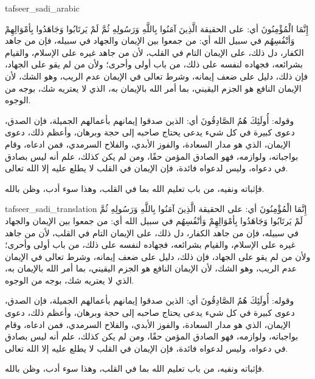 \begin{taggedblock}{tafseer_sadi_arabic}
\begin{Arabic}
{ إِنَّمَا الْمُؤْمِنُونَ }
أي: على الحقيقة
{ الَّذِينَ آمَنُوا بِاللَّهِ وَرَسُولِهِ ثُمَّ لَمْ يَرتَابُوا وَجَاهَدُوا بِأمْوَالِهِمْ وَأنْفُسِهُم في سبيل الله }
أي: من جمعوا بين الإيمان والجهاد في سبيله، فإن من جاهد الكفار، دل ذلك، على الإيمان التام في القلب، لأن من جاهد غيره على الإسلام، والقيام بشرائعه، فجهاده لنفسه على ذلك، من باب أولى وأحرى؛ ولأن من لم يقو على الجهاد، فإن ذلك، دليل على ضعف إيمانه، وشرط تعالى في الإيمان عدم الريب، وهو الشك، لأن الإيمان النافع هو الجزم اليقيني، بما أمر الله بالإيمان به، الذي لا يعتريه شك، بوجه من الوجوه.

وقوله:
{ أُولَئِكَ هُمُ الصَّادِقُونَ }
أي: الذين صدقوا إيمانهم بأعمالهم الجميلة، فإن الصدق، دعوى كبيرة في كل شيء يدعى يحتاج صاحبه إلى حجة وبرهان، وأعظم ذلك، دعوى الإيمان، الذي هو مدار السعادة، والفوز الأبدي، والفلاح السرمدي، فمن ادعاه، وقام بواجباته، ولوازمه، فهو الصادق المؤمن حقًا، ومن لم يكن كذلك، علم أنه ليس بصادق في دعواه، وليس لدعواه فائدة، فإن الإيمان في القلب لا يطلع عليه إلا الله تعالى.

فإثباته ونفيه، من باب تعليم الله بما في القلب، وهذا سوء أدب، وظن بالله.
\end{Arabic}
\end{taggedblock}
\begin{taggedblock}{tafseer_sadi_translation}
{ إِنَّمَا الْمُؤْمِنُونَ }
أي: على الحقيقة
{ الَّذِينَ آمَنُوا بِاللَّهِ وَرَسُولِهِ ثُمَّ لَمْ يَرتَابُوا وَجَاهَدُوا بِأمْوَالِهِمْ وَأنْفُسِهُم في سبيل الله }
أي: من جمعوا بين الإيمان والجهاد في سبيله، فإن من جاهد الكفار، دل ذلك، على الإيمان التام في القلب، لأن من جاهد غيره على الإسلام، والقيام بشرائعه، فجهاده لنفسه على ذلك، من باب أولى وأحرى؛ ولأن من لم يقو على الجهاد، فإن ذلك، دليل على ضعف إيمانه، وشرط تعالى في الإيمان عدم الريب، وهو الشك، لأن الإيمان النافع هو الجزم اليقيني، بما أمر الله بالإيمان به، الذي لا يعتريه شك، بوجه من الوجوه.

وقوله:
{ أُولَئِكَ هُمُ الصَّادِقُونَ }
أي: الذين صدقوا إيمانهم بأعمالهم الجميلة، فإن الصدق، دعوى كبيرة في كل شيء يدعى يحتاج صاحبه إلى حجة وبرهان، وأعظم ذلك، دعوى الإيمان، الذي هو مدار السعادة، والفوز الأبدي، والفلاح السرمدي، فمن ادعاه، وقام بواجباته، ولوازمه، فهو الصادق المؤمن حقًا، ومن لم يكن كذلك، علم أنه ليس بصادق في دعواه، وليس لدعواه فائدة، فإن الإيمان في القلب لا يطلع عليه إلا الله تعالى.

فإثباته ونفيه، من باب تعليم الله بما في القلب، وهذا سوء أدب، وظن بالله.
\end{taggedblock}

\begin{comment}
Please use the following for footnotes:- Sample\footnoteQ{Text of Qur'an footnote goes here.}.
Sample\footnoteT{Text of Tafseer footnote goes here.}.
\end{comment}